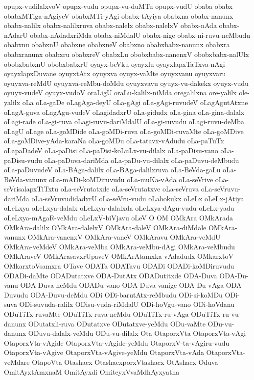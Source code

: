 {opupx-vudilalxvoV
opupx-vudu
opupx-vu-duMTu
opupx-vudU
obaba
obabx
obabxMTiga-nAgiyeV
obabxMTi-yAgi
obabx-tAyiya
obabxna
obabx-nanunx
obabx-nalilx
obabx-nalilxruva
obabx-nalelx
obabx-nalelxV
obabx-nAda
obabx-nAdarU
obabx-nAdadxriMda
obabx-niMdalU
obabx-nige
obabx-ni-ruvu-neMbudu
obabxnu
obabxnU
obabxne
obabxneV
obabxno
obabxbabx-nanunx
obabxra
obabxranunx
obabxru
obabxreV
obabxLu
obobxbabx-nanenxV
obobxbabx-nalUlx
obobxbabxnU
obobxbabxrU
oyayx-beVku
oyayxlu
oyayxlapxTaTxva-nAgi
oyayxlapxDuvane
oyuyxtAtx
oyuyxva
oyuyx-vaMte
oyuyxvanu
oyuyxvaru
oyuyxva-reMdU
oyuyxva-reMbu-doMdu
oyuyxvavu
oyuyx-vu-dakekx
oyuyx-vudu
oyuyx-vudeV
oyuyx-vudoV
oraLigU
oraLu-kalilx-niMda
oregalilxna
ore-yalilx
ole-yalilx
oLa
oLa-gaDe
oLagAga-deyU
oLa-gAgi
oLa-gAgi-ruvudeV
oLagAgutAtxne
oLagA-guva
oLagAgu-vudeV
oLagidadxrU
oLa-gidudx
oLa-gina
oLa-gina-dalalx
oLagi-rade
oLa-gi-ruva
oLagi-ruvu-dariMdalU
oLa-gi-ruvudu
oLagi-ruvu-deMba
oLagU
oLage
oLa-goMDide
oLa-goMDi-ruva
oLa-goMDi-ruvaMte
oLa-goMDive
oLa-goMDive-yAda-karaNa
oLa-goMDu
oLa-tatavx-vAdudu
oLa-paTuTx
oLapaDadeV
oLa-paDisi
oLa-paDisi-koLuLx-vu-dilalx
oLa-paDisu-vano
oLa-paDisu-vudu
oLa-paDuva-dariMda
oLa-paDu-vu-dilalx
oLa-paDuvu-deMbudu
oLa-paDuvudeV
oLa-BAga-dalilx
oLa-BAga-dalilxruva
oLa-BeVda-gaLu
oLa-BeVda-vanunx
oLa-mADi-koMDiruvudu
oLa-muKa-vAda
oLa-seVrive
oLa-seVrisalapxTiTxtu
oLa-seVrutatxde
oLa-seVrutatxve
oLa-seVruva
oLa-seVruvu-dariMda
oLa-seVruvudidadxrU
oLa-seVru-vudu
oLahokukx
oLeLx
oLeLx-jAtiya
oLeLxya
oLeLxya-dalalx
oLeLxya-dalalxda
oLeLxya-dAgu-vudu
oLeLx-yadu
oLeLxya-mAgaR-veMdu
oLeLxV-biVjavu
oLeV
O
OM
OMkAra
OMkArada
OMkAra-dalilx
OMkAra-dalelxV
OMkAra-daleV
OMkAra-diMdale
OMkAra-vanunx
OMkAra-vanenxV
OMkAra-vaneV
OMkAravu
OMkAra-veMdU
OMkAra-veMdeV
OMkAra-veMba
OMkAra-veMbu-dAgi
OMkAra-veMbudu
OMkAraveV
OMkArasavxrUpaveV
OMkArAtamxka-vAdadudx
OMkarxtoV
OMkarxtoVsamxra
OTave
ODATa
ODATavu
ODADi
ODADi-koMDiruvudu
ODADi-daMte
ODADutatxve
ODA-DutAtx
ODADutitxde
ODA-Duva
ODA-Du-vanu
ODA-Duva-neMdu
ODADu-vano
ODA-Duva-vanige
ODA-Du-vAga
ODA-Duvudu
ODA-Duvu-deMdu
ODi
ODi-barutAtx-reMbudu
ODi-si-koMDu
ODi-suva
ODi-suvuda-ralilx
ODisu-vuda-riMdalU
ODi-hoVgu-vano
ODi-hoVdanu
ODuTiTx-ruvaMte
ODuTiTx-ruva-neMdu
ODuTiTx-ru-vAga
ODuTiTx-ru-vu-danunx
ODutatxli-ruva
ODutatxve
ODutatxve-yeMdu
ODu-vaMte
ODu-vu-danunx
ODuvu-dalalx-veMdu
ODu-vu-dilalx
Ota
OtaporxVta
OtaporxVta-vAgi
OtaporxVta-vAgide
OtaporxVta-vAgide-yeMdu
OtaporxV-ta-vAgiru-vudu
OtaporxVta-vAgive
OtaporxVta-vAgive-yeMdu
OtaporxVta-vAda
OtaporxVta-veMdare
OtapoVta
Otashacx
OtashacxporxVtashacx
OtAshacx
Oduva
OmitAyxtAmxnaM
OmitAyxdi
OmiteyxVvaMdhAyxyatha
}
